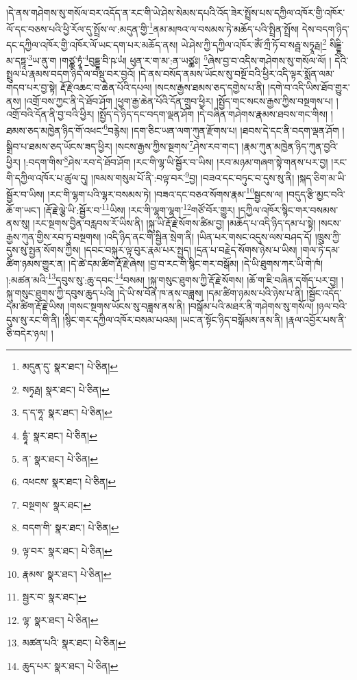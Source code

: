 །དེ་ནས་གཤེགས་སུ་གསོལ་བར་འདོད་ན་རང་གི་ཡེ་ཤེས་སེམས་དཔའི་འོད་ཟེར་སྤྲོས་པས་དཀྱིལ་འཁོར་གྱི་འཁོར་ལོ་དང་བཅས་པའི་ཕྱི་རོལ་དུ་སྤྲོས་ལ་:མདུན་གྱི་\footnote{མདུན་དུ་  སྣར་ཐང་།  པེ་ཅིན། }ནམ་མཁའ་ལ་བསམས་ཏེ་མཆོད་པའི་སྤྲིན་སྤྲོས། དེས་བདག་ཉིད་དང་དཀྱིལ་འཁོར་གྱི་འཁོར་ལོ་ཡང་དག་པར་མཆོད་ནས། ཡེ་ཤེས་ཀྱི་དཀྱིལ་འཁོར་ཨོཾ་ཀྲྀ་ཏོ་བ་སརྦྦ་སཏྭཱརྠ།\footnote{སཏྭརྠ།  སྣར་ཐང་།  པེ་ཅིན། } སིདྡྷི་མ་དཏྟཱ་\footnote{ད་ད་ཧཱ་  སྣར་ཐང་།  པེ་ཅིན། }ཡ་ནུ་ག །གཙྪ་ཏྭཱཾ་\footnote{དྷཱཾ་  སྣར་ཐང་།  པེ་ཅིན། }བུདྡྷ་བི་ཥ་ཡཾ། ཕུན་ར་ག་མ་:ན་ཡཙྪཿ། \footnote{ན་  སྣར་ཐང་།  པེ་ཅིན། }ཞེས་བྱ་བ་འདིས་གཤེགས་སུ་གསོལ་ལོ། །
དེའི་སྤྲུལ་པ་རྣམས་བདག་ཉིད་ལ་བསྡུ་བར་བྱའོ། །དེ་ནས་བསོད་ནམས་ཡོངས་སུ་བསྔོ་བའི་ཕྱིར་འདི་ལྟར་སྨོན་ལམ་གདབ་པར་བྱ་སྟེ། རྡོ་རྗེ་འཆང་བ་ཆེན་པོའི་དཔལ། །སངས་རྒྱས་ཐམས་ཅད་དགྱེས་པ་ནི། །དགེ་བ་འདི་ཡིས་ཐོབ་གྱུར་ནས། །འགྲོ་བས་ཀྱང་ནི་དེ་ཐོབ་ཤོག །ཕྱག་རྒྱ་ཆེན་པོའི་དོན་གྲུབ་ཕྱིར། །སྤྱོད་གང་སངས་རྒྱས་ཀྱིས་བསྔགས་པ། །འགྲོ་བའི་དོན་ནི་བྱ་བའི་ཕྱིར། །སྤྱོད་དེ་ཉིད་དང་བདག་ལྡན་ཤོག །དེ་བཞིན་གཤེགས་རྣམས་ཐབས་གང་གིས། །ཐམས་ཅད་མཁྱེན་ཉིད་གོ་འཕང་\footnote{འཕངས་  སྣར་ཐང་།  པེ་ཅིན། }བརྙེས། །དག་ཅིང་ཡན་ལག་ཀུན་རྫོགས་པ། །ཐབས་དེ་དང་ནི་བདག་ལྡན་ཤོག །སྒྲིབ་པ་ཐམས་ཅད་ཡོངས་ཟད་ཕྱིར། །སངས་རྒྱས་ཀྱིས་སྔགས་\footnote{བསྔགས་  སྣར་ཐང་། }ཤེས་རབ་གང་། །རྣམ་ཀུན་མཁྱེན་ཉིད་ཀུན་བྱའི་ཕྱིར། །:བདག་གིས་\footnote{བདག་གི་  སྣར་ཐང་།  པེ་ཅིན། }ཤེས་རབ་དེ་ཐོབ་ཤོག །རང་གི་ལྷ་ཡི་སྦྱོར་བ་ཡིས། །རབ་མཉམ་གཞག་སྟེ་གནས་པར་བྱ། །རང་གི་དཀྱིལ་འཁོར་པ་ཚུལ་དུ། །ཁམས་གསུམ་པོ་ནི་:བལྟ་བར་\footnote{ལྟ་བར་  སྣར་ཐང་།  པེ་ཅིན། }བྱ། །བཟའ་དང་བཏུང་བ་དུས་སུ་ནི། །སྐད་ཅིག་མ་ཡི་སྦྱོར་བ་ཡིས། །རང་གི་ལྷག་པའི་ལྷར་བསམས་ཏེ། །བཟའ་དང་བཅའ་སོགས་རྣམ་\footnote{རྣམས་  སྣར་ཐང་།  པེ་ཅིན། }སྦྱངས་ལ། །བདུད་རྩི་མྱང་བའི་ཆོ་ག་ཡང་། །རྡོ་རྗེ་ལྕེ་ཡི་:སྦྱོར་བ་\footnote{སྦྱར་བ་  སྣར་ཐང་། }ཡིས། །རང་གི་ལྷག་ལྷག་\footnote{ལྷ་  སྣར་ཐང་།  པེ་ཅིན། }གཙོ་བོར་གྱུར། །དཀྱིལ་འཁོར་སྙིང་གར་བསམས་ནས་སུ། །རང་སྔགས་བྱིན་བརླབས་རོ་ཡིས་ནི། །སྐུ་ཡི་རྡོ་རྗེ་སོགས་ཚིམ་བྱ། །མཆོད་པ་འདི་ཉིད་དམ་པ་སྟེ། །སངས་རྒྱས་ཀུན་གྱིས་རབ་ཏུ་བསྔགས། །འདི་ཉིད་ནང་གི་སྦྱིན་སྲེག་ནི། །ཡིན་པར་གསང་འདུས་ལས་བཤད་དོ། །ཁྲུས་ཀྱི་དུས་སུ་སྤྱན་སོགས་ཀྱིས། །དབང་བསྐུར་ལྟ་བུར་རྣམ་པར་སྤྱད། །དྲན་པ་བརྗེད་སོགས་ཉེས་པ་ཡིས། །གལ་ཏེ་དམ་ཚིག་ཉམས་གྱུར་ན། །དེ་ཚེ་དམ་ཚིག་རྡོ་རྗེ་ཞེས། །བྱ་བ་རང་གི་སྙིང་གར་བསྒོམ། །དེ་ཡི་ཐུགས་ཀར་ཡི་གེ་ཁཾ། །:མཚན་མའི་\footnote{མཚན་པའི་  སྣར་ཐང་།  པེ་ཅིན། }དབུས་སུ་:ཆུ་དབང་\footnote{ཆུད་པར་  སྣར་ཐང་།  པེ་ཅིན། }བསམ། །སྐུ་གསུང་ཐུགས་ཀྱི་རྡོ་རྗེ་སོགས། །ཆོ་ག་ཇི་བཞིན་དགོད་པར་བྱ། །སྐུ་གསུང་ཐུགས་ཀྱི་དབུས་ཆུད་པའི། །དེ་ཡི་ས་བོན་ཁ་ནས་བཟླས། །དམ་ཚིག་ཉམས་པའི་ཉེས་པ་ནི། །སྦྱོང་འདོད་དམ་ཚིག་རྡོ་རྗེ་ཡིས། །གསང་སྔགས་ཡོངས་སུ་བཟླས་ནས་ནི། །བསྒོམ་པའི་མཐར་ནི་གཤེགས་སུ་གསོལ། །ཉལ་བའི་དུས་སུ་རང་གི་ནི། །སྙིང་གར་དཀྱིལ་འཁོར་བསམ་པའམ། །ཡང་ན་སྟོང་ཉིད་བསྒོམས་ནས་ནི། །རྣལ་འབྱོར་པས་ནི་ཅི་བདེར་ཉལ། །
